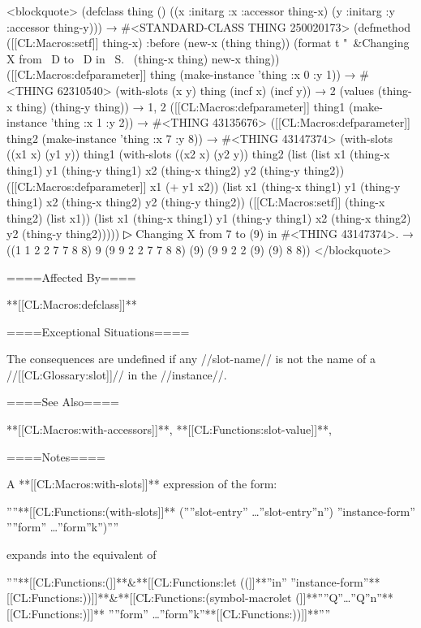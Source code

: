 <blockquote> (defclass thing () ((x :initarg :x :accessor thing-x) (y :initarg :y :accessor thing-y))) → #<STANDARD-CLASS THING 250020173> (defmethod ([[CL:Macros:setf]] thing-x) :before (new-x (thing thing)) (format t "~&Changing X from ~D to ~D in ~S.~ (thing-x thing) new-x thing)) ([[CL:Macros:defparameter]] thing (make-instance 'thing :x 0 :y 1)) → #<THING 62310540> (with-slots (x y) thing (incf x) (incf y)) → 2 (values (thing-x thing) (thing-y thing)) → 1, 2 ([[CL:Macros:defparameter]] thing1 (make-instance 'thing :x 1 :y 2)) → #<THING 43135676> ([[CL:Macros:defparameter]] thing2 (make-instance 'thing :x 7 :y 8)) → #<THING 43147374> (with-slots ((x1 x) (y1 y)) thing1 (with-slots ((x2 x) (y2 y)) thing2 (list (list x1 (thing-x thing1) y1 (thing-y thing1) x2 (thing-x thing2) y2 (thing-y thing2)) ([[CL:Macros:defparameter]] x1 (+ y1 x2)) (list x1 (thing-x thing1) y1 (thing-y thing1) x2 (thing-x thing2) y2 (thing-y thing2)) ([[CL:Macros:setf]] (thing-x thing2) (list x1)) (list x1 (thing-x thing1) y1 (thing-y thing1) x2 (thing-x thing2) y2 (thing-y thing2)))))
▷ Changing X from 7 to (9) in #<THING 43147374>. → ((1 1 2 2 7 7 8 8) 9 (9 9 2 2 7 7 8 8) (9) (9 9 2 2 (9) (9) 8 8)) </blockquote>

====Affected By====

**[[CL:Macros:defclass]]**

====Exceptional Situations====

The consequences are undefined if any //slot-name// is not the name of a //[[CL:Glossary:slot]]// in the //instance//.

====See Also====

**[[CL:Macros:with-accessors]]**, **[[CL:Functions:slot-value]]**, 

====Notes====

A **[[CL:Macros:with-slots]]** expression of the form:

''''\jot\vbox{\settabs\+\cr \+**[[CL:Functions:(with-slots]]** (''{''slot-entry''} \ldots{''slot-entry''}\sub n'') ''instance-form'' ''{''form''} \ldots{''form''}\sub k'')\cr}''''

\noindent expands into the equivalent of

''''\jot\vbox{\settabs\+\cr \+**[[CL:Functions:(]]**&**[[CL:Functions:let ((]]**''in'' ''instance-form''**[[CL:Functions:))]]**\cr \+&**[[CL:Functions:(symbol-macrolet (]]**''{''Q''}\ldots {''Q''}\sub n''**[[CL:Functions:)]]** ''{''form''} \ldots{''form''}\sub k''**[[CL:Functions:))]]**\cr}''''

